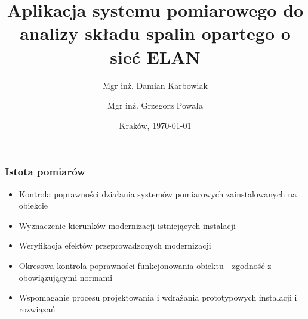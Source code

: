 \documentclass[ucs]{beamer}
\title[Gas Analyzer]{Aplikacja systemu pomiarowego do analizy składu spalin opartego o sieć ELAN}
\author[D. Karbowiak, G. Powała]{Mgr inż. Damian Karbowiak  \and Mgr inż. Grzegorz Powała}
\institute[Politechnika Śl.]{\large Politechnika Śląska \\\vspace{0.5cm} \texttt{[image: images/PolslLogo]} }
\date{Kraków, \today}
\begin{document}
\begin{frame}
  \titlepage
\end{frame}

\begin{frame}
\frametitle{Istota pomiarów}
\begin{itemize}
\setlength{\itemsep}{5pt}
\setlength{\parskip}{5pt}
\setlength{\parsep}{5pt}
\item Kontrola poprawności działania systemów pomiarowych zainstalowanych na obiekcie
\item Wyznaczenie kierunków modernizacji istniejących instalacji
\item Weryfikacja efektów przeprowadzonych modernizacji
\item Okresowa kontrola poprawności funkcjonowania obiektu - zgodność z obowiązującymi normami
\item Wspomaganie procesu projektowania i wdrażania prototypowych instalacji i rozwiązań
\end{itemize}
\end{frame}
\end{document}
